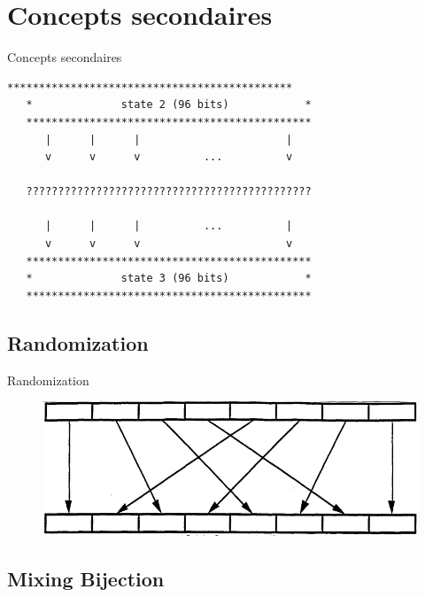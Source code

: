 \documentclass{beamer}
\begin{document}
\section{Concepts secondaires}

\begin{frame}[fragile]{Concepts secondaires}
\begin{Verbatim}[samepage=true]
   *********************************************
   *              state 2 (96 bits)            *
   *********************************************
      |      |      |                       |
      v      v      v          ...          v
 
   ?????????????????????????????????????????????
 
      |      |      |          ...          |
      v      v      v                       v
   *********************************************
   *              state 3 (96 bits)            *
   *********************************************
\end{Verbatim}
\end{frame}

\subsection{Randomization}

\begin{frame}{Randomization}
  \begin{figure}[h]
    \centering
    \includegraphics[scale=0.4]{./images/randomization.png}
  \end{figure}
\end{frame}

\subsection{Mixing Bijection}
\end{document}
